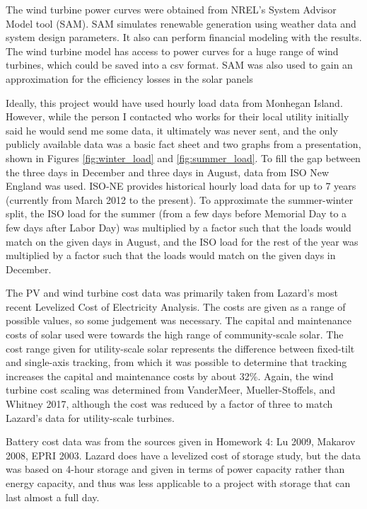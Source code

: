 \documentclass{article}
\begin{document}
The wind turbine power curves were obtained from NREL's System Advisor Model tool (SAM).  SAM simulates renewable generation using weather data and system design parameters.  It also can perform financial modeling with the results.  The wind turbine model has access to power curves for a huge range of wind turbines, which could be saved into a csv format.  SAM was also used to gain an approximation for the efficiency losses in the solar panels

Ideally, this project would have used hourly load data from Monhegan Island.  However, while the person I contacted who works for their local utility initially said he would send me some data, it ultimately was never sent, and the only publicly available data was a basic fact sheet\cite{NE_Energy_Reports} and two graphs from a presentation\cite{Monhegan_Presentation}, shown in Figures \ref{fig:winter_load} and \ref{fig:summer_load}.  To fill the gap between the three days in December and three days in August, data from ISO New England was used.  ISO-NE provides historical hourly load data for up to 7 years (currently from March 2012 to the present).\cite{ISO}  To approximate the summer-winter split, the ISO load for the summer (from a few days before Memorial Day to a few days after Labor Day) was multiplied by a factor such that the loads would match on the given days in August, and the ISO load for the rest of the year was multiplied by a factor such that the loads would match on the given days in December.

The PV and wind turbine cost data was primarily taken from Lazard's most recent Levelized Cost of Electricity Analysis.\cite{Lazard2018}  The costs are given as a range of possible values, so some judgement was necessary.  The capital and maintenance costs of solar used were towards the high range of community-scale solar.  The cost range given for utility-scale solar represents the difference between fixed-tilt and single-axis tracking, from which it was possible to determine that tracking increases the capital and maintenance costs by about 32\%.  Again, the wind turbine cost scaling was determined from VanderMeer, Mueller-Stoffels, and Whitney 2017, although the cost was reduced by a factor of three to match Lazard's data for utility-scale turbines.

Battery cost data was from the sources given in Homework 4: Lu 2009, Makarov 2008, EPRI 2003.  Lazard does have a levelized cost of storage study, but the data was based on 4-hour storage and given in terms of power capacity rather than energy capacity, and thus was less applicable to a project with storage that can last almost a full day.
\end{document}
